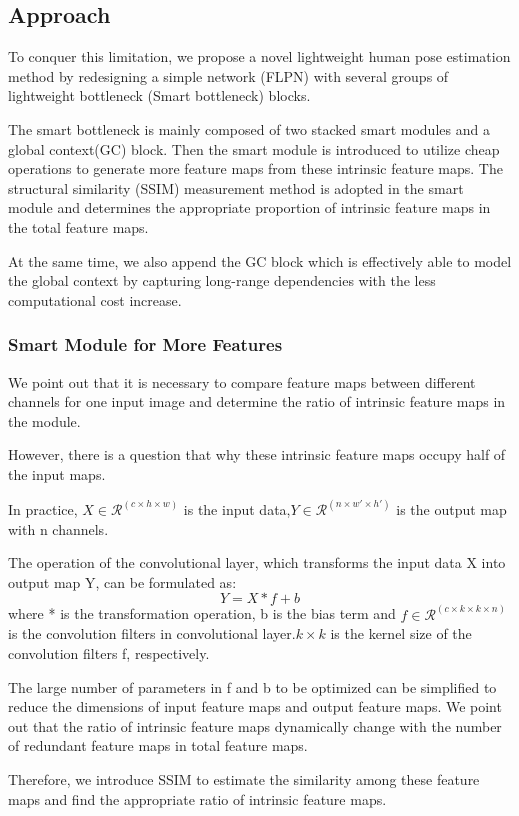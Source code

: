 \documentclass[11pt]{article}
\begin{document}
\subsection{Approach}
To conquer this limitation, we propose a novel lightweight human pose estimation method by redesigning a simple network (FLPN) with several groups of lightweight bottleneck (Smart bottleneck) blocks.

The smart bottleneck is mainly composed of two stacked smart modules and a global context(GC) block. Then the smart module is introduced to utilize cheap operations to generate more feature maps from these intrinsic feature maps. The structural similarity (SSIM) measurement method is adopted in the smart module and determines the appropriate proportion of intrinsic feature maps in the total feature maps.

At the same time, we also append the GC block which is effectively able to model the global context by capturing long-range dependencies with the less computational cost increase.

\subsubsection{Smart Module for More Features}
We point out that it is necessary to compare feature maps between different channels for one input image and determine the ratio of intrinsic feature maps in the module.

However, there is a question that why these intrinsic feature maps occupy half of the input maps.

In practice, $X\in \mathcal{R}^{(c\times h\times w)}$ is the input data,$Y\in \mathcal{R}^{(n\times w'\times h')}$ is the output map with n channels.

The operation of the convolutional layer, which transforms the input data X into output map Y, can be formulated as:
$$Y = X * f + b$$
where * is the transformation operation, b is the bias term and $f\in \mathcal{R}^{(c\times k\times k\times n)}$ is the convolution filters in convolutional layer.$k\times k$ is the kernel size of the convolution filters f, respectively.

The large number of parameters in f and b to be optimized can be simplified to reduce the dimensions of input feature maps and output feature maps. We point out that the ratio of intrinsic feature maps dynamically change with the number of redundant feature maps in total feature maps.

Therefore, we introduce SSIM to estimate the similarity among these feature maps and find the appropriate ratio of intrinsic feature maps.
\end{document}
